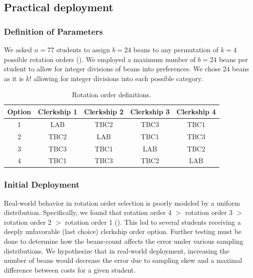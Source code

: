 \documentclass{article}
\begin{document}
\subsection{Practical deployment}
\subsubsection{Definition of Parameters}
We asked $n = 77$ students to assign $b = 24$ beans to any permutation of $k = 4$ possible rotation orders (). We employed a maximum number of $b = 24$ beans per student to allow for integer divisions of beans into preferences. We chose 24 beans as it is $k!$ allowing for integer divisions into each possible category.

\begin{table}[h]
	\centering
	\caption{Rotation order definitions.}
	\label{tab:rotation-orders}
	\small
	\begin{tabular}{ccccc}
		\toprule
		Option & Clerkship 1 & Clerkship 2 & Clerkship 3 & Clerkship 4 \\
		\midrule
		1      & LAB         & TBC2        & TBC3        & TBC1        \\
		2      & TBC2        & LAB         & TBC1        & TBC3        \\
		3      & TBC3        & TBC1        & LAB         & TBC2        \\
		4      & TBC1        & TBC3        & TBC2        & LAB         \\
		\bottomrule
	\end{tabular}
\end{table}

\subsubsection{Initial Deployment}
Real-world behavior in rotation order selection is poorly modeled by a uniform distribution. Specifically, we found that rotation order 4 $>$ rotation order 3 $>$ rotation order 2 $>$ rotation order 1 (). This led to several students receiving a deeply unfavorable (last choice) clerkship order option. Further testing must be done to determine how the beans-count affects the error under various sampling distributions. We hypothesize that in real-world deployment, increasing the number of beans would decrease the error due to sampling skew and a maximal difference between costs for a given student.
\end{document}
